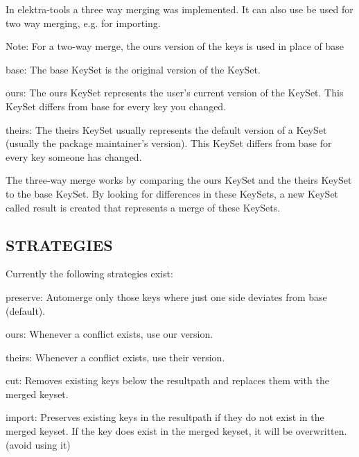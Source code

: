 In elektra-\/tools a three way merging was implemented. It can also use be used for two way merging, e.\+g. for importing.

Note\+: For a two-\/way merge, the {\ttfamily ours} version of the keys is used in place of {\ttfamily base}


\begin{DoxyItemize}
\item {\ttfamily base}\+: The {\ttfamily base} Key\+Set is the original version of the Key\+Set.
\item {\ttfamily ours}\+: The {\ttfamily ours} Key\+Set represents the user's current version of the Key\+Set. This Key\+Set differs from {\ttfamily base} for every key you changed.
\item {\ttfamily theirs}\+: The {\ttfamily theirs} Key\+Set usually represents the default version of a Key\+Set (usually the package maintainer's version). This Key\+Set differs from {\ttfamily base} for every key someone has changed.
\end{DoxyItemize}

The three-\/way merge works by comparing the {\ttfamily ours} Key\+Set and the {\ttfamily theirs} Key\+Set to the {\ttfamily base} Key\+Set. By looking for differences in these Key\+Sets, a new Key\+Set called {\ttfamily result} is created that represents a merge of these Key\+Sets.

\subsection*{S\+T\+R\+A\+T\+E\+G\+I\+E\+S}

Currently the following strategies exist\+:


\begin{DoxyItemize}
\item preserve\+: Automerge only those keys where just one side deviates from base (default).
\item ours\+: Whenever a conflict exists, use our version.
\item theirs\+: Whenever a conflict exists, use their version.
\item cut\+: Removes existing keys below the resultpath and replaces them with the merged keyset.
\item import\+: Preserves existing keys in the resultpath if they do not exist in the merged keyset. If the key does exist in the merged keyset, it will be overwritten. (avoid using it) 
\end{DoxyItemize}